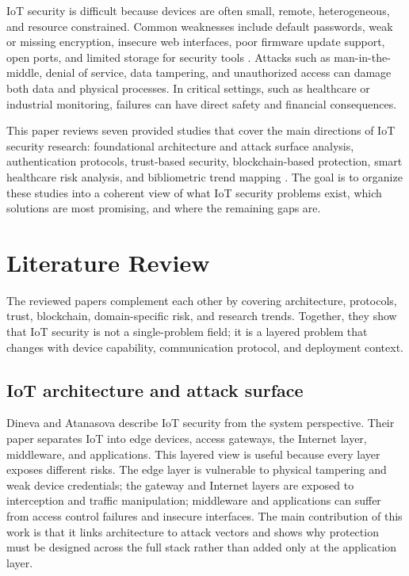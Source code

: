 \documentclass[conference]{IEEEtran}
\begin{document}
IoT security is difficult because devices are often small, remote, heterogeneous, and resource constrained. Common weaknesses include default passwords, weak or missing encryption, insecure web interfaces, poor firmware update support, open ports, and limited storage for security tools \cite{dineva}. Attacks such as man-in-the-middle, denial of service, data tampering, and unauthorized access can damage both data and physical processes. In critical settings, such as healthcare or industrial monitoring, failures can have direct safety and financial consequences.

This paper reviews seven provided studies that cover the main directions of IoT security research: foundational architecture and attack surface analysis, authentication protocols, trust-based security, blockchain-based protection, smart healthcare risk analysis, and bibliometric trend mapping \cite{dineva,qadir,yalli,trust,bibliometric,healthcare,tradeoff}. The goal is to organize these studies into a coherent view of what IoT security problems exist, which solutions are most promising, and where the remaining gaps are.

\section{Literature Review}
The reviewed papers complement each other by covering architecture, protocols, trust, blockchain, domain-specific risk, and research trends. Together, they show that IoT security is not a single-problem field; it is a layered problem that changes with device capability, communication protocol, and deployment context.

\subsection{IoT architecture and attack surface}
Dineva and Atanasova \cite{dineva} describe IoT security from the system perspective. Their paper separates IoT into edge devices, access gateways, the Internet layer, middleware, and applications. This layered view is useful because every layer exposes different risks. The edge layer is vulnerable to physical tampering and weak device credentials; the gateway and Internet layers are exposed to interception and traffic manipulation; middleware and applications can suffer from access control failures and insecure interfaces. The main contribution of this work is that it links architecture to attack vectors and shows why protection must be designed across the full stack rather than added only at the application layer.
\end{document}
